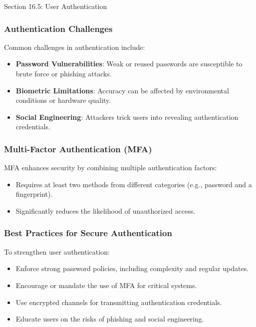 \begin{notes}{Section 16.5: User Authentication}
    \subsubsection*{Authentication Challenges}
    
    Common challenges in authentication include:
    \begin{itemize}
        \item \textbf{Password Vulnerabilities}: Weak or reused passwords are susceptible to brute force or phishing attacks.
        \item \textbf{Biometric Limitations}: Accuracy can be affected by environmental conditions or hardware quality.
        \item \textbf{Social Engineering}: Attackers trick users into revealing authentication credentials.
    \end{itemize}
    
    \subsubsection*{Multi-Factor Authentication (MFA)}
    
    MFA enhances security by combining multiple authentication factors:
    \begin{itemize}
        \item Requires at least two methods from different categories (e.g., password and a fingerprint).
        \item Significantly reduces the likelihood of unauthorized access.
    \end{itemize}
    
    \subsubsection*{Best Practices for Secure Authentication}
    
    To strengthen user authentication:
    \begin{itemize}
        \item Enforce strong password policies, including complexity and regular updates.
        \item Encourage or mandate the use of MFA for critical systems.
        \item Use encrypted channels for transmitting authentication credentials.
        \item Educate users on the risks of phishing and social engineering.
    \end{itemize}
    

\end{notes}
